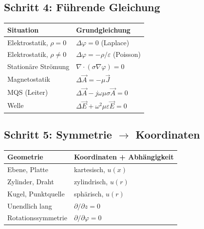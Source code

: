\documentclass[a4paper]{article}
\newcommand{\imp}[1]{{\color{accent}\bfseries #1}}
\newcommand{\E}{\vec E}
\newcommand{\J}{\vec J}
\newcommand{\A}{\vec A}
\newcommand{\eps}{\varepsilon}
\begin{document}
\subsection*{Schritt 4: Führende Gleichung}

\begin{schema}
\begin{tabular}{p{5cm} p{9cm}}
\imp{Situation} & \imp{Grundgleichung} \\ \hline
Elektrostatik, $\rho=0$ & $\Delta\varphi=0$ (Laplace) \\
Elektrostatik, $\rho\neq0$ & $\Delta\varphi=-\rho/\eps$ (Poisson) \\
Stationäre Strömung & $\nabla\cdot(\sigma\nabla\varphi)=0$ \\
Magnetostatik & $\Delta\A=-\mu\J$ \\
MQS (Leiter) & $\Delta\A-j\omega\mu\sigma\A=0$ \\
Welle & $\Delta\E+\omega^2\mu\eps\E=0$ \\
\end{tabular}
\end{schema}

\vspace{2pt}

\subsection*{Schritt 5: Symmetrie $\rightarrow$ Koordinaten}

\begin{schema}
\begin{tabular}{p{4cm} p{10cm}}
\imp{Geometrie} & \imp{Koordinaten + Abhängigkeit} \\ \hline
Ebene, Platte & kartesisch, $u(x)$ \\
Zylinder, Draht & zylindrisch, $u(r)$ \\
Kugel, Punktquelle & sphärisch, $u(r)$ \\
Unendlich lang & $\partial/\partial z=0$ \\
Rotationssymmetrie & $\partial/\partial\varphi=0$ \\
\end{tabular}
\end{schema}

\vspace{2pt}

\end{document}
